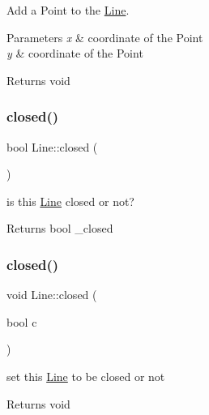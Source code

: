 Add a Point to the \hyperlink{class_line}{Line}. 


\begin{DoxyParams}{Parameters}
{\em x} & coordinate of the Point \\
\hline
{\em y} & coordinate of the Point \\
\hline
\end{DoxyParams}
\begin{DoxyReturn}{Returns}
void 
\end{DoxyReturn}
\mbox{\label{class_line_ae8d925ead08fe61d66621bfc0299482d}} 
\subsubsection{\texorpdfstring{closed()}{closed()}\hspace{0.1cm}{\footnotesize\ttfamily [1/2]}}
{\footnotesize\ttfamily bool Line\+::closed (\begin{DoxyParamCaption}{ }\end{DoxyParamCaption})\hspace{0.3cm}{\ttfamily [inline]}}



is this \hyperlink{class_line}{Line} closed or not? 

\begin{DoxyReturn}{Returns}
bool \+\_\+closed 
\end{DoxyReturn}
\mbox{\label{class_line_ac5c50dee9dd6f623a3c8ee523d504ecc}} 
\subsubsection{\texorpdfstring{closed()}{closed()}\hspace{0.1cm}{\footnotesize\ttfamily [2/2]}}
{\footnotesize\ttfamily void Line\+::closed (\begin{DoxyParamCaption}\item[{bool}]{c }\end{DoxyParamCaption})\hspace{0.3cm}{\ttfamily [inline]}}



set this \hyperlink{class_line}{Line} to be closed or not 

\begin{DoxyReturn}{Returns}
void 
\end{DoxyReturn}
\mbox{\label{class_line_a0cd9c7b2633e708869daaece09a2f941}} 

